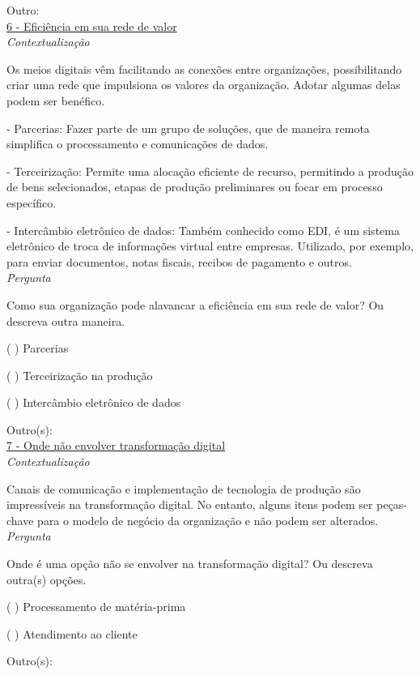 Outro:\\


\underline{6 - Eficiência em sua rede de valor}\\

\textit{Contextualização}

Os meios digitais vêm facilitando as conexões entre organizações, possibilitando criar uma rede que impulsiona os valores da organização. Adotar algumas delas podem ser benéfico.

- Parcerias: Fazer parte de um grupo de soluções, que de maneira remota simplifica o processamento e comunicações de dados.

- Terceirização: Permite uma alocação eficiente de recurso, permitindo a produção de bens selecionados, etapas de produção preliminares ou focar em processo específico. 

- Intercâmbio eletrônico de dados: Também conhecido como EDI, é um sistema eletrônico de troca de informações virtual entre empresas. Utilizado, por exemplo, para enviar documentos, notas fiscais, recibos de pagamento e outros.\\


\textit{Pergunta}

Como sua organização pode alavancar a eficiência em sua rede de valor? Ou descreva outra maneira.

( ) Parcerias

( ) Terceirização na produção

( ) Intercâmbio eletrônico de dados

Outro(s):\\


\underline{7 - Onde não envolver transformação digital}\\

\textit{Contextualização}

Canais de comunicação e implementação de tecnologia de produção são impressíveis na transformação digital. No entanto, alguns itens podem ser peças-chave para o modelo de negócio da organização e não podem ser alterados.\\


\textit{Pergunta}

Onde é uma opção não se envolver na transformação digital? Ou descreva outra(s) opções.

( ) Processamento de matéria-prima

( ) Atendimento ao cliente

Outro(s):\\


